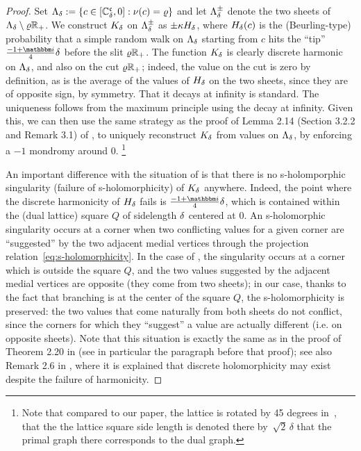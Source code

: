 \documentclass[12pt,oneside,english]{amsart}
\numberwithin{equation}{section}
\numberwithin{figure}{section}
\theoremstyle{plain}
\theoremstyle{plain}
\theoremstyle{plain}
\theoremstyle{plain}
\theoremstyle{remark}
\theoremstyle{definition}
\theoremstyle{plain}
\theoremstyle{plain}
\numberwithin{thm}{section}
\begin{document}
\begin{proof}
Set $\Lambda_{{\delta}}
:= \left\{  c \in {\left[  {\mathbb{C}_{{\delta}}^{\mathfrak{c}}}, 0  \right]} : {\nu}(c) = \varrho  \right\} $
and let $\Lambda_{{\delta}}^{\pm}$ denote the two sheets 
of $\Lambda_{{\delta}}\setminus\varrho \mathbb{R}_{+}$.
We construct $K_{{\delta}}$ on $\Lambda_{{\delta}}^{\pm}$ as $\pm\kappa 
H_{{\delta}}$,
where $H_{{\delta}}(c) $ is the (Beurling-type) probability
that a simple random walk on $\Lambda_{{\delta}}$ starting from $c$
hits the ``tip'' $\frac{-1+\ii }{4}\meshsz$ before the slit 
$\varrho \mathbb{R}_{+}$. The function
$K_{{\delta}}$ is clearly discrete harmonic on $\Lambda_{{\delta}}$,
and also on the cut $\varrho \mathbb{R}_{+}$; indeed, the value on
the cut is zero by definition, as is the average of the values of
$H_{{\delta}}$ on the two sheets, since they are of opposite sign,
by symmetry. That it decays at infinity is standard. The uniqueness
follows from the maximum principle using the decay at infinity. Given
this, we can then use the same strategy as the proof of Lemma 2.14
(Section 3.2.2 and Remark 3.1) of \cite{chelkak-hongler-izyurov},
to uniquely reconstruct $K_{{\delta}}$ from values on $\Lambda_{{\delta}}$,
by enforcing a $-1$ mondromy around $0$. \footnote{Note that compared to our 
paper, the lattice is rotated by 45 degrees
in~\cite{chelkak-hongler-izyurov}, that the 
the lattice square side length is denoted there
by~$\sqrt{2}\,\delta$
that the primal graph
there corresponds to the dual graph.
}

An important difference with the situation of \cite{chelkak-hongler-izyurov}
is that there is no s-holomporphic singularity (failure of s-holomorphicity)
of $K_{{\delta}}$ anywhere. Indeed, the point where the discrete harmonicity
of $H_{{\delta}}$ fails is $\frac{-1+\ii }{4}\meshsz$, which is contained
within the (dual lattice) square $Q$ of sidelength ${\delta}$ centered
at $0$. An s-holomorphic singularity occurs at a corner when two
conflicting values for a given corner are ``suggested'' by the two
adjacent medial vertices through 
the projection relation~\eqref{eq:s-holomorphicity}.
In the case of \cite{chelkak-hongler-izyurov}, the singularity occurs
at a corner which is outside the square $Q$, and the two values suggested
by the adjacent medial vertices are opposite (they come from two sheets);
in our case, thanks to the fact that branching is at the center of
the square $Q$, the s-holomorphicity is preserved: the two values
that come naturally from both sheets do not conflict, since the corners
for which they ``suggest'' a value are actually different (i.e.
on opposite sheets). Note that this situation is exactly the same
as in the proof of Theorem 2.20 in \cite{chelkak-hongler-izyurov}
(see in particular the paragraph before that proof); see also Remark
2.6 in \cite{gheissari-hongler-park}, where it is explained that
discrete holomorphicity may exist despite the failure of harmonicity. 
\end{proof}
\end{document}
